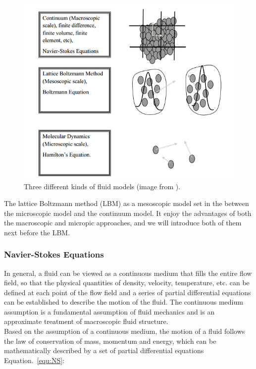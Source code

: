 \begin{figure}[!tb]
   \centering
       \includegraphics[width=1\textwidth]{figures/fluid_model.png}
       \caption{Three different kinds of fluid models (image from \cite{karatzas1998brownian}).}
       \label{fig:fluid_models}
\end{figure}

The lattice Boltzmann method (LBM) as a mesoscopic model set in the between the microscopic model and the continuum model. It enjoy the advantages of both the macroscopic and micropic approaches, and we will introduce both of them next before the LBM.

\subsubsection{Navier-Stokes Equations} \label{sec:nse}
In general, a fluid can be viewed as a continuous medium that fills the entire flow field, so that the physical quantities of density, velocity, temperature, etc. can be defined at each point of the flow field and a series of partial differential equations can be established to describe the motion of the fluid. The continuous medium assumption is a fundamental assumption of fluid mechanics and is an approximate treatment of macroscopic fluid structure.\\

Based on the assumption of a continuous medium, the motion of a fluid follows the law of conservation of mass, momentum and energy, which can be mathematically described by a set of partial differential equations Equation.~\ref{equ:NS}:

